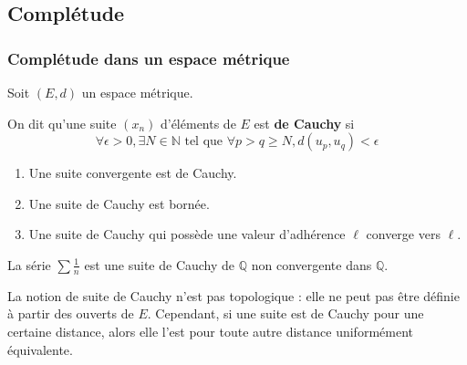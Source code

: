 




  \subsection{Complétude}

  \subsubsection{Complétude dans un espace métrique}


  Soit $(E,d)$ un espace métrique.

  \begin{definition}
    On dit qu'une suite $(x_n)$ d'éléments de $E$ est \textbf{de Cauchy} si
    \[ \forall \epsilon > 0, \exists N \in \mathbb{N} \text{ tel que } \forall p > q \geq N, d(u_p, u_q) < \epsilon \]
  \end{definition}

  \begin{proposition}
    \begin{enumerate}[label={\bfseries(\roman*)}]
      \item Une suite convergente est de Cauchy.
      \item Une suite de Cauchy est bornée.
      \item Une suite de Cauchy qui possède une valeur d'adhérence $\ell$ converge vers $\ell$.
    \end{enumerate}
  \end{proposition}


  \begin{cexample}
    La série $\sum \frac{1}{n}$ est une suite de Cauchy de $\mathbb{Q}$ non convergente dans $\mathbb{Q}$.
  \end{cexample}


  \begin{remark}
    La notion de suite de Cauchy n'est pas topologique : elle ne peut pas être définie à partir des ouverts de $E$. Cependant, si une suite est de Cauchy pour une certaine distance, alors elle l'est pour toute autre distance uniformément équivalente.
  \end{remark}

